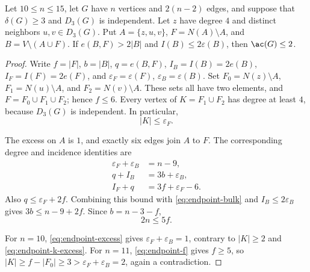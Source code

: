 \begin{proposition}
\label{prop:endpoint-shared-hub}
Let \(10\le n\le15\), let \(G\) have \(n\) vertices and \(2(n-2)\)
edges, and suppose that \(\delta(G)\ge3\) and \(D_3(G)\) is independent.
Let \(z\) have degree \(4\) and distinct neighbors \(u,v\in D_3(G)\).
Put \(A=\{z,u,v\}\), \(F=N(A)\setminus A\), and
\(B=V\setminus(A\cup F)\).
If \(e(B,F)>2|B|\) and \(I(B)\le2\varepsilon(B)\), then \(\ac(G)\le2\).
\end{proposition}

\begin{proof}
Write \(f=|F|\), \(b=|B|\), \(q=e(B,F)\),
\(I_B=I(B)=2e(B)\), \(I_F=I(F)=2e(F)\), and
\(\varepsilon_F=\varepsilon(F)\), \(\varepsilon_B=\varepsilon(B)\).  Set
\(F_0=N(z)\setminus A\), \(F_1=N(u)\setminus A\), and
\(F_2=N(v)\setminus A\).  These sets all have two elements, and
\(F=F_0\cup F_1\cup F_2\); hence
\(f\le6\).  Every vertex of \(K=F_1\cup F_2\) has degree at least
\(4\), because \(D_3(G)\) is independent.  In particular,
\begin{equation}\label{eq:endpoint-k-excess}
  |K|\le \varepsilon_F.
\end{equation}

The excess on \(A\) is \(1\), and exactly six edges join \(A\) to \(F\).
The corresponding degree and incidence identities are
\begin{align}
 \varepsilon_F+\varepsilon_B&=n-9,                 \label{eq:endpoint-excess}\\
 q+I_B&=3b+\varepsilon_B,                           \label{eq:endpoint-bulk}\\
 I_F+q&=3f+\varepsilon_F-6.                         \label{eq:endpoint-moat}
\end{align}
Also \(q\le \varepsilon_F+2f\).  Combining this bound with
\eqref{eq:endpoint-bulk} and \(I_B\le2\varepsilon_B\) gives
\(3b\le n-9+2f\).  Since \(b=n-3-f\),
\begin{equation}\label{eq:endpoint-f}
  2n\le5f.
\end{equation}

For \(n=10\), \eqref{eq:endpoint-excess} gives
\(\varepsilon_F+\varepsilon_B=1\), contrary to \(|K|\ge2\) and
\eqref{eq:endpoint-k-excess}.  For \(n=11\),
\eqref{eq:endpoint-f} gives \(f\ge5\), so
\(|K|\ge f-|F_0|\ge3>\varepsilon_F+\varepsilon_B=2\), again a contradiction.


\end{proof}
